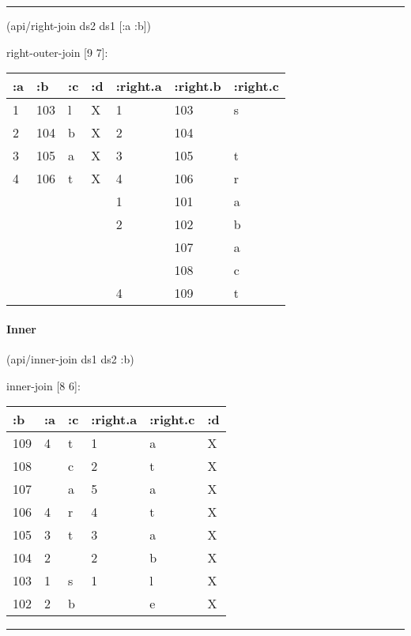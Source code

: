 \documentclass[]{article}
\newenvironment{Shaded}{\begin{snugshade}}{\end{snugshade}}
\newcommand{\AttributeTok}[1]{\textcolor[rgb]{0.77,0.63,0.00}{#1}}
\newcommand{\NormalTok}[1]{#1}
\let\oldparagraph\paragraph
\renewcommand{\paragraph}[1]{\oldparagraph{#1}\mbox{}}
\begin{document}
\begin{center}\rule{0.5\linewidth}{0.5pt}\end{center}

\begin{Shaded}
\begin{Highlighting}[]
\NormalTok{(api/right-join ds2 ds1 [}\AttributeTok{:a} \AttributeTok{:b}\NormalTok{])}
\end{Highlighting}
\end{Shaded}

right-outer-join {[}9 7{]}:

\begin{longtable}[]{@{}lllllll@{}}
\toprule
:a & :b & :c & :d & :right.a & :right.b & :right.c\tabularnewline
\midrule
\endhead
1 & 103 & l & X & 1 & 103 & s\tabularnewline
2 & 104 & b & X & 2 & 104 &\tabularnewline
3 & 105 & a & X & 3 & 105 & t\tabularnewline
4 & 106 & t & X & 4 & 106 & r\tabularnewline
& & & & 1 & 101 & a\tabularnewline
& & & & 2 & 102 & b\tabularnewline
& & & & & 107 & a\tabularnewline
& & & & & 108 & c\tabularnewline
& & & & 4 & 109 & t\tabularnewline
\bottomrule
\end{longtable}

\paragraph{Inner}\label{inner}

\begin{Shaded}
\begin{Highlighting}[]
\NormalTok{(api/inner-join ds1 ds2 }\AttributeTok{:b}\NormalTok{)}
\end{Highlighting}
\end{Shaded}

inner-join {[}8 6{]}:

\begin{longtable}[]{@{}llllll@{}}
\toprule
:b & :a & :c & :right.a & :right.c & :d\tabularnewline
\midrule
\endhead
109 & 4 & t & 1 & a & X\tabularnewline
108 & & c & 2 & t & X\tabularnewline
107 & & a & 5 & a & X\tabularnewline
106 & 4 & r & 4 & t & X\tabularnewline
105 & 3 & t & 3 & a & X\tabularnewline
104 & 2 & & 2 & b & X\tabularnewline
103 & 1 & s & 1 & l & X\tabularnewline
102 & 2 & b & & e & X\tabularnewline
\bottomrule
\end{longtable}

\begin{center}\rule{0.5\linewidth}{0.5pt}\end{center}
\end{document}
